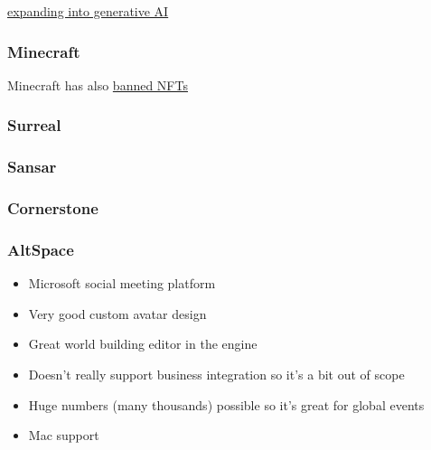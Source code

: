 \href{https://twitter.com/bilawalsidhu/status/1644817961952374784}{expanding into generative AI}

\subsubsection{Minecraft}
Minecraft has also \href{https://www.minecraft.net/en-us/article/minecraft-and-nfts}{banned NFTs}
\subsubsection{Surreal}
\subsubsection{Sansar}
\subsubsection{Cornerstone}
\subsubsection{AltSpace}
\begin{itemize}
\item Microsoft social meeting platform
\item Very good custom avatar design
\item Great world building editor in the engine
\item Doesn't really support business integration so it's a bit out of scope
\item Huge numbers (many thousands) possible so it's great for global events
\item Mac support
\end{itemize}
